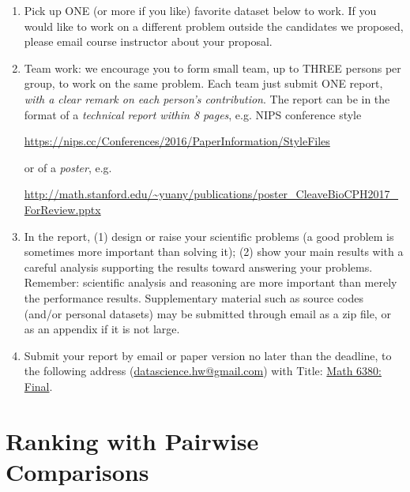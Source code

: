 \documentclass[11pt]{article}
\begin{document}
\begin{enumerate}
\item Pick up ONE (or more if you like) favorite dataset below to work. If you would like to work on a different problem outside the candidates we proposed, please email course instructor about your proposal.  
\item Team work: we encourage you to form small team, up to THREE persons per group, to work on the same problem. Each team just submit ONE report, \emph{with a clear remark on each person's contribution}. The report can be in the format of a \emph{technical report within 8 pages}, e.g. NIPS conference style 
\begin{center}
\url{https://nips.cc/Conferences/2016/PaperInformation/StyleFiles} 
\end{center}
or of a \emph{poster}, e.g. 
\begin{center}\url{http://math.stanford.edu/~yuany/publications/poster_CleaveBioCPH2017_ForReview.pptx}
\end{center}
\item In the report, (1) design or raise your scientific problems (a good problem is sometimes more important than solving it); (2) show your main results with a careful analysis supporting the results toward answering your problems. Remember: scientific analysis and reasoning are more important than merely the performance results. Supplementary material such as source codes (and/or personal datasets) may be submitted through email as a zip file, or as an appendix if it is not large.    
\item Submit your report by email or paper version no later than the deadline, to the following address (\href{mailto:datascience.hw@gmail.com}{datascience.hw@gmail.com}) with Title: \underline{Math 6380: Final}. %
\end{enumerate}

\section{Ranking with Pairwise Comparisons}
\end{document}
